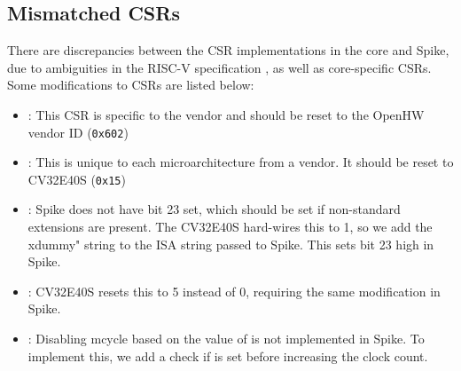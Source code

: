 \subsection{Mismatched CSRs}%

There are discrepancies between the CSR implementations in the core and Spike, due to ambiguities in the RISC-V specification \cite{watermanRISCVInstructionSet2021}, as well as core-specific CSRs. Some modifications to CSRs are listed below:

\begin{itemize}
    \item {}: This CSR is specific to the vendor and should be reset to the OpenHW vendor ID (\lstinline{0x602}) 
    \item {}: This is unique to each microarchitecture from a vendor. It should be reset to CV32E40S  (\lstinline{0x15})
    \item {}: Spike does not have bit 23 set, which should be set if non-standard extensions are present\cite{watermanRISCVInstructionSet2021}. The CV32E40S hard-wires this to 1, so we add the xdummy" string to the ISA string passed to Spike. This sets bit 23 high in Spike.
    \item {}: CV32E40S resets this to 5 instead of 0, requiring the same modification in Spike.
    \item {}: Disabling mcycle based on the value of  is not implemented in Spike. To implement this, we add a check if  is set before increasing the clock count.
\end{itemize}

%
%






